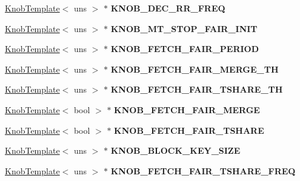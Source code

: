 \begin{DoxyCompactItemize}
\item 
\hypertarget{classall__knobs__c_acd1a68eec9ee8e21ff8571cd825ba28e}{
\hyperlink{classKnobTemplate}{KnobTemplate}$<$ uns $>$ $\ast$ {\bfseries KNOB\_\-DEC\_\-RR\_\-FREQ}}
\label{classall__knobs__c_acd1a68eec9ee8e21ff8571cd825ba28e}

\item 
\hypertarget{classall__knobs__c_a799ee7a983bb1b30dfb5c370409934dc}{
\hyperlink{classKnobTemplate}{KnobTemplate}$<$ uns $>$ $\ast$ {\bfseries KNOB\_\-MT\_\-STOP\_\-FAIR\_\-INIT}}
\label{classall__knobs__c_a799ee7a983bb1b30dfb5c370409934dc}

\item 
\hypertarget{classall__knobs__c_ad6ac3c864e998eafa4614dcdf3f3321c}{
\hyperlink{classKnobTemplate}{KnobTemplate}$<$ uns $>$ $\ast$ {\bfseries KNOB\_\-FETCH\_\-FAIR\_\-PERIOD}}
\label{classall__knobs__c_ad6ac3c864e998eafa4614dcdf3f3321c}

\item 
\hypertarget{classall__knobs__c_ad0e5c9dca6adb112f7e5843f5b59d1fd}{
\hyperlink{classKnobTemplate}{KnobTemplate}$<$ uns $>$ $\ast$ {\bfseries KNOB\_\-FETCH\_\-FAIR\_\-MERGE\_\-TH}}
\label{classall__knobs__c_ad0e5c9dca6adb112f7e5843f5b59d1fd}

\item 
\hypertarget{classall__knobs__c_aec7e1a8c87d3942a5893b6f9cb2e6696}{
\hyperlink{classKnobTemplate}{KnobTemplate}$<$ uns $>$ $\ast$ {\bfseries KNOB\_\-FETCH\_\-FAIR\_\-TSHARE\_\-TH}}
\label{classall__knobs__c_aec7e1a8c87d3942a5893b6f9cb2e6696}

\item 
\hypertarget{classall__knobs__c_a8875be1d414d2a7969ca72c5e51474d8}{
\hyperlink{classKnobTemplate}{KnobTemplate}$<$ bool $>$ $\ast$ {\bfseries KNOB\_\-FETCH\_\-FAIR\_\-MERGE}}
\label{classall__knobs__c_a8875be1d414d2a7969ca72c5e51474d8}

\item 
\hypertarget{classall__knobs__c_a612e85ea461629d636bcd8b7ba4c9639}{
\hyperlink{classKnobTemplate}{KnobTemplate}$<$ bool $>$ $\ast$ {\bfseries KNOB\_\-FETCH\_\-FAIR\_\-TSHARE}}
\label{classall__knobs__c_a612e85ea461629d636bcd8b7ba4c9639}

\item 
\hypertarget{classall__knobs__c_a320ab03a3726a97ccd7e88463fb91279}{
\hyperlink{classKnobTemplate}{KnobTemplate}$<$ uns $>$ $\ast$ {\bfseries KNOB\_\-BLOCK\_\-KEY\_\-SIZE}}
\label{classall__knobs__c_a320ab03a3726a97ccd7e88463fb91279}

\item 
\hypertarget{classall__knobs__c_a7252aa8597022b8c00d4e2a6a760e0a9}{
\hyperlink{classKnobTemplate}{KnobTemplate}$<$ uns $>$ $\ast$ {\bfseries KNOB\_\-FETCH\_\-FAIR\_\-TSHARE\_\-FREQ}}
\label{classall__knobs__c_a7252aa8597022b8c00d4e2a6a760e0a9}


\end{DoxyCompactItemize}
